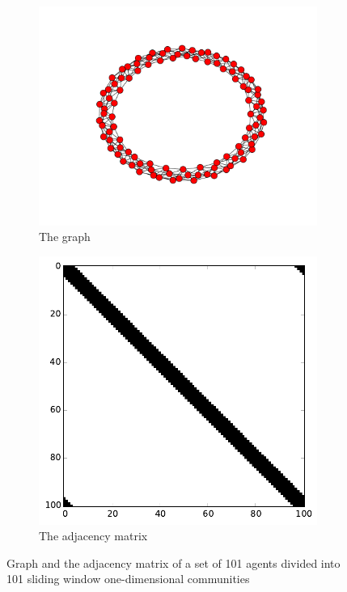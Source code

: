 \begin{figure}[h]
        \centering
        \begin{subfigure}[b]{0.5\textwidth}
        	\centering
                \includegraphics[width=\textwidth]{images/topology/sliding_window_graph.pdf}
                \caption{The graph}
        \end{subfigure}
        \begin{subfigure}[b]{0.4\textwidth}
        	\centering
                \includegraphics[width=\textwidth]{images/topology/sliding_window_adjacency.pdf}
                \caption{The adjacency matrix}
                \label{subfig:sliding adjacency}
        \end{subfigure}
        \caption{Graph and the adjacency matrix of a set of 101 agents divided into 101 sliding window one-dimensional communities}
        \label{fig:sliding adjacency graph}
\end{figure}

